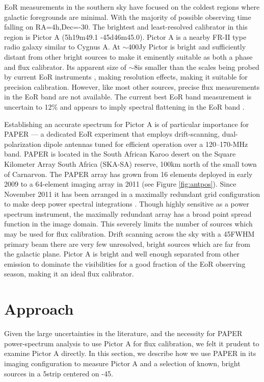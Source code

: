 \documentclass[preprint]{aastex}
\begin{document}
EoR measurements in the southern sky have focused on the coldest regions where
galactic foregrounds are minimal. With the majority of possible observing time falling on 
RA=4h,Dec=-30. The brightest and least-resolved calibrator in this region is Pictor A 
(5h19m49.1 -45d46m45.0). Pictor A is a nearby FR-II type radio galaxy 
 similar to Cygnus A.  At $\sim$400Jy Pictor is bright and sufficiently distant from other 
bright sources to make it eminently suitable as both a phase and flux calibrator. Its apparent
size of $\sim$8\arcmin is smaller than the scales being probed by current EoR instruments , 
making resolution effects, making it suitable for precision calibration.  However, 
like most other sources, precise flux measurements in the EoR band are not available.
The current best EoR band measurement
is uncertain to 12\% and appears to imply spectral flattening in the EoR band
\citep{Perley:1997p9312}. 
 
Establishing an accurate spectrum for Pictor A is of particular importance for
PAPER --- a dedicated EoR experiment 
that employs drift-scanning, dual-polarization dipole antennas 
tuned for efficient operation over a 120--170-MHz band.  PAPER is located in the South African Karoo desert
on the Square Kilometer Array
South Africa (SKA-SA) reserve, 100km north of the small town of Carnarvon.
The PAPER array has grown from 16 elements deployed in early 2009 to a
64-element imaging array in 2011 (see Figure \ref{fig:antpos}). 
Since November 2011 it has been arranged in a maximally redundant grid 
configuration to make deep power spectral integrations \citep{Parsons:2012a}.
Though highly sensitive as a power spectrum instrument, the maximally redundant array 
has a broad point spread function in the image domain. This severely limits the number 
of sources which may be used for flux calibration. Drift scanning across the sky with a 45\arcdeg FWHM
primary beam there are very few unresolved, bright sources which are far from the galactic plane. 
Pictor A is bright and well enough separated from other emission to dominate the visibilities for a good fraction of
the EoR observing season, making it an ideal flux calibrator.





\section{Approach}
\label{sec:approach}
Given the large uncertainties in the literature, and the necessity for PAPER power-spectrum analysis
to use Pictor A for flux calibration, we felt it prudent to examine Pictor A directly.
In this section, we describe how we use PAPER in its imaging configuration
to measure Pictor A and a selection of known, bright sources in a 5\arcdeg strip centered
on -45\arcdeg. 
\end{document}

